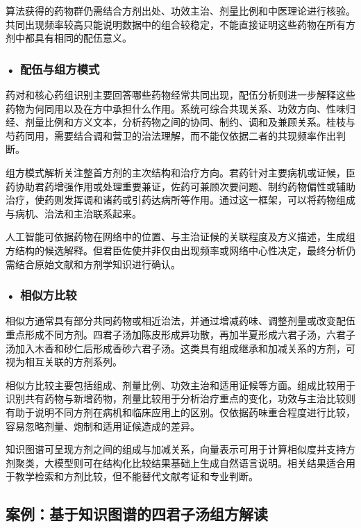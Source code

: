 算法获得的药物群仍需结合方剂出处、功效主治、剂量比例和中医理论进行核验。共同出现频率较高只能说明数据中的组合较稳定，不能直接证明这些药物在所有方剂中都具有相同的配伍意义。

\subsubsection*{\textbf{• 配伍与组方模式}}

药对和核心药组识别主要回答哪些药物经常共同出现，配伍分析则进一步解释这些药物为何同用以及在方中承担什么作用。系统可综合共现关系、功效方向、性味归经、剂量比例和方义文本，分析药物之间的协同、制约、调和及兼顾关系。桂枝与芍药同用，需要结合调和营卫的治法理解，而不能仅依据二者的共现频率作出判断。

组方模式解析关注整首方剂的主次结构和治疗方向。君药针对主要病机或证候，臣药协助君药增强作用或处理重要兼证，佐药可兼顾次要问题、制约药物偏性或辅助治疗，使药则发挥调和诸药或引药达病所等作用。通过这一框架，可以将药物组成与病机、治法和主治联系起来。

人工智能可依据药物在网络中的位置、与主治证候的关联程度及方义描述，生成组方结构的候选解释。但君臣佐使并非仅由出现频率或网络中心性决定，最终分析仍需结合原始文献和方剂学知识进行确认。

\subsubsection*{\textbf{• 相似方比较}}

相似方通常具有部分共同药物或相近治法，并通过增减药味、调整剂量或改变配伍重点形成不同方剂。四君子汤加陈皮形成异功散，再加半夏形成六君子汤，六君子汤加入木香和砂仁后形成香砂六君子汤。这类具有组成继承和加减关系的方剂，可视为相互关联的方剂系列。

相似方比较主要包括组成、剂量比例、功效主治和适用证候等方面。组成比较用于识别共有药物与新增药物，剂量比较用于分析治疗重点的变化，功效与主治比较则有助于说明不同方剂在病机和临床应用上的区别。仅依据药味重合程度进行比较，容易忽略剂量、炮制和适用证候造成的差异。

知识图谱可呈现方剂之间的组成与加减关系，向量表示可用于计算相似度并支持方剂聚类，大模型则可在结构化比较结果基础上生成自然语言说明。相关结果适合用于教学检索和方剂比较，但不能替代文献考证和专业判断。

\subsection{案例：基于知识图谱的四君子汤组方解读}

